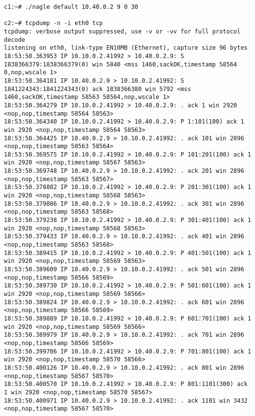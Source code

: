 \documentclass[a4paper,12pt]{article}
\begin{document}
\begin{lstlisting}
c1:~# ./nagle default 10.40.0.2 9 0 30

c2:~# tcpdump -n -i eth0 tcp
tcpdump: verbose output suppressed, use -v or -vv for full protocol decode
listening on eth0, link-type EN10MB (Ethernet), capture size 96 bytes
18:53:50.363953 IP 10.10.0.2.41992 > 10.40.0.2.9: S 1838366379:1838366379(0) win 5840 <mss 1460,sackOK,timestamp 58564 0,nop,wscale 1>
18:53:50.364181 IP 10.40.0.2.9 > 10.10.0.2.41992: S 1841224343:1841224343(0) ack 1838366380 win 5792 <mss 1460,sackOK,timestamp 58563 58564,nop,wscale 1>
18:53:50.364279 IP 10.10.0.2.41992 > 10.40.0.2.9: . ack 1 win 2920 <nop,nop,timestamp 58564 58563>
18:53:50.364340 IP 10.10.0.2.41992 > 10.40.0.2.9: P 1:101(100) ack 1 win 2920 <nop,nop,timestamp 58564 58563>
18:53:50.364425 IP 10.40.0.2.9 > 10.10.0.2.41992: . ack 101 win 2896 <nop,nop,timestamp 58563 58564>
18:53:50.369575 IP 10.10.0.2.41992 > 10.40.0.2.9: P 101:201(100) ack 1 win 2920 <nop,nop,timestamp 58567 58563>
18:53:50.369748 IP 10.40.0.2.9 > 10.10.0.2.41992: . ack 201 win 2896 <nop,nop,timestamp 58563 58567>
18:53:50.378882 IP 10.10.0.2.41992 > 10.40.0.2.9: P 201:301(100) ack 1 win 2920 <nop,nop,timestamp 58568 58563>
18:53:50.379086 IP 10.40.0.2.9 > 10.10.0.2.41992: . ack 301 win 2896 <nop,nop,timestamp 58563 58568>
18:53:50.379238 IP 10.10.0.2.41992 > 10.40.0.2.9: P 301:401(100) ack 1 win 2920 <nop,nop,timestamp 58568 58563>
18:53:50.379433 IP 10.40.0.2.9 > 10.10.0.2.41992: . ack 401 win 2896 <nop,nop,timestamp 58563 58568>
18:53:50.389415 IP 10.10.0.2.41992 > 10.40.0.2.9: P 401:501(100) ack 1 win 2920 <nop,nop,timestamp 58569 58563>
18:53:50.389609 IP 10.40.0.2.9 > 10.10.0.2.41992: . ack 501 win 2896 <nop,nop,timestamp 58566 58569>
18:53:50.389730 IP 10.10.0.2.41992 > 10.40.0.2.9: P 501:601(100) ack 1 win 2920 <nop,nop,timestamp 58569 58566>
18:53:50.389824 IP 10.40.0.2.9 > 10.10.0.2.41992: . ack 601 win 2896 <nop,nop,timestamp 58566 58569>
18:53:50.389889 IP 10.10.0.2.41992 > 10.40.0.2.9: P 601:701(100) ack 1 win 2920 <nop,nop,timestamp 58569 58566>
18:53:50.389979 IP 10.40.0.2.9 > 10.10.0.2.41992: . ack 701 win 2896 <nop,nop,timestamp 58566 58569>
18:53:50.399706 IP 10.10.0.2.41992 > 10.40.0.2.9: P 701:801(100) ack 1 win 2920 <nop,nop,timestamp 58570 58566>
18:53:50.400126 IP 10.40.0.2.9 > 10.10.0.2.41992: . ack 801 win 2896 <nop,nop,timestamp 58567 58570>
18:53:50.400570 IP 10.10.0.2.41992 > 10.40.0.2.9: P 801:1101(300) ack 1 win 2920 <nop,nop,timestamp 58570 58567>
18:53:50.400971 IP 10.40.0.2.9 > 10.10.0.2.41992: . ack 1101 win 3432 <nop,nop,timestamp 58567 58570>

\end{lstlisting}
\end{document}

